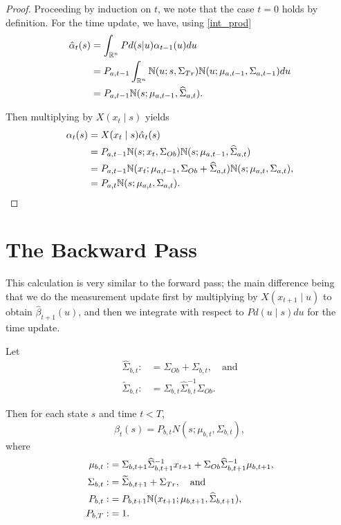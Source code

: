 \documentclass[12pt,leqno]{article}
\begin{document}
\begin{proof}

Proceeding by induction on $t$, we note that the case $t = 0$ holds by definition.
For the time update, we have, using \eqref{int_prod}
\begin{align}
  \hat{\alpha}_t(s) &= \int_{{\mathbb R}^n}Pd(s|u)\alpha_{t-1}(u)du \\\notag
 &= P_{a,t-1}\int_{{\mathbb R}^n}{\mathbb N}(u;s,\Sigma_{Tr}){\mathbb N}(u;\mu_{a,t-1},\Sigma_{a,t-1})du \notag\\
 &= P_{a,t-1}{\mathbb N}(s;\mu_{a,t-1},\widehat{\Sigma}_{a,t}).
\end{align}

Then multiplying by $X(x_t\mid s)$ yields
\begin{align*}
  \alpha_t(s) &= X(x_t\mid s)\hat{\alpha}_t(s) \\
  &= P_{a,t-1}{\mathbb N}(s;x_t,\Sigma_{Ob}){\mathbb N}(s;\mu_{a,t-1},\widehat{\Sigma}_{a,t}) \\
  &= P_{a,t-1}{\mathbb N}(x_t;\mu_{a,t-1},\Sigma_{Ob} + \widehat{\Sigma}_{a,t}){\mathbb N}(s;\mu_{a,t},\Sigma_{a,t}), \\
  &= P_{a,t}{\mathbb N}(s;\mu_{a,t},\Sigma_{a,t}).
\end{align*}
\end{proof}

\section{The Backward Pass}
This calculation is very similar to the forward pass; the main difference being that we do
the measurement update first by multiplying by $X(x_{t+1}\mid u)$ to obtain $\hat{\beta}_{t+1}(u)$,
and then we integrate with respect to $Pd(u\mid s)du$ for the time update.  

\begin{Thm}\label{beta:1}
  Let 
\begin{align*}
  \widehat{\Sigma}_{b,t} :&= \Sigma_{Ob}+\Sigma_{b,t},\quad\text{and}\\
    \widetilde{\Sigma}_{b,t} :&= \Sigma_{b,t}\widehat{\Sigma}_{b,t}^{-1}\Sigma_{Ob}.
\end{align*}

  Then for each state $s$ and time $t < T$,
$$
  \beta_t(s) = P_{b,t}N(s;\mu_{b,t},\Sigma_{b,t}),
$$
where
\begin{align*}
  \mu_{b,t} :&= \Sigma_{b,t+1}\widehat{\Sigma}_{b,t+1}^{-1}x_{t+1} + \Sigma_{Ob}\widehat{\Sigma}_{b,t+1}^{-1}\mu_{b,t+1},\\
  \Sigma_{b,t} :&= \widetilde{\Sigma}_{b,t+1} + \Sigma_{Tr},\quad\text{and}\\
  P_{b,t}:&=P_{b,t+1}{\mathbb N}(x_{t+1};\mu_{b,t+1},\widehat{\Sigma}_{b,t+1}),\\
  P_{b,T} :&= 1.
\end{align*}
\end{Thm}
\end{document}
